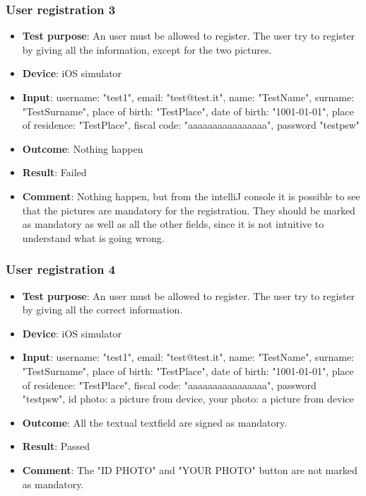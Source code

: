 \documentclass[../ATD.tex]{subfiles}
\begin{document}
    \subsubsection{User registration 3}\label{subsubsec:user-registration-3}
    \begin{itemize}
        \item \textbf{Test purpose}: An user must be allowed to register.
        The user try to register by giving all the information, except for the two pictures.
        \item \textbf{Device}: iOS simulator
        \item \textbf{Input}: username: "test1", email: "test@test.it", name: "TestName", surname: "TestSurname", place of birth: "TestPlace", date of birth: "1001-01-01", place of residence: "TestPlace", fiscal code: "aaaaaaaaaaaaaaaa", password "testpsw"
        \item \textbf{Outcome}: Nothing happen
        \item \textbf{Result}: Failed
        \item \textbf{Comment}: Nothing happen, but from the intelliJ console it is possible to see that the pictures are mandatory for the registration.
        They should be marked as mandatory as well as all the other fields, since it is not intuitive to understand what is going wrong.
    \end{itemize}

    \subsubsection{User registration 4}\label{subsubsec:user-registration-4}
    \begin{itemize}
        \item \textbf{Test purpose}: An user must be allowed to register.
        The user try to register by giving all the correct information.
        \item \textbf{Device}: iOS simulator
        \item \textbf{Input}: username: "test1", email: "test@test.it", name: "TestName", surname: "TestSurname", place of birth: "TestPlace", date of birth: "1001-01-01", place of residence: "TestPlace", fiscal code: "aaaaaaaaaaaaaaaa", password "testpsw", id photo: a picture from device, your photo: a picture from device
        \item \textbf{Outcome}: All the textual textfield are signed as mandatory.
        \item \textbf{Result}: Passed
        \item \textbf{Comment}: The "ID PHOTO" and "YOUR PHOTO" button are not marked as mandatory.
    \end{itemize}
\end{document}
